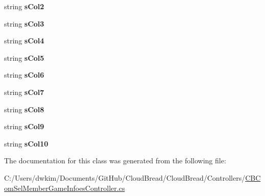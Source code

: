 \begin{DoxyCompactItemize}
\item 
string {\bfseries s\+Col2}\hypertarget{a00160_a791dd3d49fec2afad4b388e90c7f21ee}{}\label{a00160_a791dd3d49fec2afad4b388e90c7f21ee}

\item 
string {\bfseries s\+Col3}\hypertarget{a00160_a93609915d1b20e1afa85232b876d83fe}{}\label{a00160_a93609915d1b20e1afa85232b876d83fe}

\item 
string {\bfseries s\+Col4}\hypertarget{a00160_ac1c0df7b4cca48c7a2457bc7ead31320}{}\label{a00160_ac1c0df7b4cca48c7a2457bc7ead31320}

\item 
string {\bfseries s\+Col5}\hypertarget{a00160_abf27e754468de2d9a54d107b446d07ee}{}\label{a00160_abf27e754468de2d9a54d107b446d07ee}

\item 
string {\bfseries s\+Col6}\hypertarget{a00160_abd391fc474de41173f9f9cb487955ae3}{}\label{a00160_abd391fc474de41173f9f9cb487955ae3}

\item 
string {\bfseries s\+Col7}\hypertarget{a00160_a91b53893e638f179fe0bda02e88d567d}{}\label{a00160_a91b53893e638f179fe0bda02e88d567d}

\item 
string {\bfseries s\+Col8}\hypertarget{a00160_a35a8135e442dbfed9c3687d60e000c85}{}\label{a00160_a35a8135e442dbfed9c3687d60e000c85}

\item 
string {\bfseries s\+Col9}\hypertarget{a00160_a6c252447937ec3aab00ce0a2caa302d1}{}\label{a00160_a6c252447937ec3aab00ce0a2caa302d1}

\item 
string {\bfseries s\+Col10}\hypertarget{a00160_a01d14ce532eebee963f4506c21b63724}{}\label{a00160_a01d14ce532eebee963f4506c21b63724}

\end{DoxyCompactItemize}


The documentation for this class was generated from the following file\+:\begin{DoxyCompactItemize}
\item 
C\+:/\+Users/dwkim/\+Documents/\+Git\+Hub/\+Cloud\+Bread/\+Cloud\+Bread/\+Controllers/\hyperlink{a00203}{C\+B\+Com\+Sel\+Member\+Game\+Infoes\+Controller.\+cs}\end{DoxyCompactItemize}
